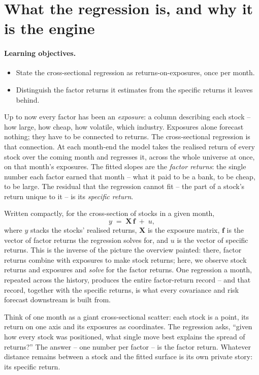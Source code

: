 \documentclass[11pt]{article}
\theoremstyle{definition}
\theoremstyle{plain}
\theoremstyle{remark}
\newcommand{\Xmat}{\mathbf{X}}
\newcommand{\fvec}{\mathbf{f}}
\begin{document}
\tableofcontents
\bigskip

\section{What the regression is, and why it is the engine}\label{sec:what}

\paragraph{Learning objectives.}
\begin{itemize}[leftmargin=1.4em,topsep=2pt]
  \item State the cross-sectional regression as returns-on-exposures, once per month.
  \item Distinguish the factor returns it estimates from the specific returns it leaves behind.
\end{itemize}

Up to now every factor has been an \emph{exposure}: a column describing each stock -- how large, how cheap, how volatile, which industry. Exposures alone forecast nothing; they have to be connected to returns. The cross-sectional regression is that connection. At each month-end the model takes the realised return of every stock over the coming month and regresses it, across the whole universe at once, on that month's exposures. The fitted slopes are the \emph{factor returns}: the single number each factor earned that month -- what it paid to be a bank, to be cheap, to be large. The residual that the regression cannot fit -- the part of a stock's return unique to it -- is its \emph{specific return}.

Written compactly, for the cross-section of stocks in a given month,
\[
y \;=\; \Xmat\,\fvec \;+\; u,
\]
where $y$ stacks the stocks' realised returns, $\Xmat$ is the exposure matrix, $\fvec$ is the vector of factor returns the regression solves for, and $u$ is the vector of specific returns. This is the inverse of the picture the overview painted: there, factor returns combine with exposures to make stock returns; here, we observe stock returns and exposures and \emph{solve} for the factor returns. One regression a month, repeated across the history, produces the entire factor-return record -- and that record, together with the specific returns, is what every covariance and risk forecast downstream is built from.

\begin{intuition}
Think of one month as a giant cross-sectional scatter: each stock is a point, its return on one axis and its exposures as coordinates. The regression asks, ``given how every stock was positioned, what single move best explains the spread of returns?'' The answer -- one number per factor -- is the factor return. Whatever distance remains between a stock and the fitted surface is its own private story: its specific return.
\end{intuition}
\end{document}
